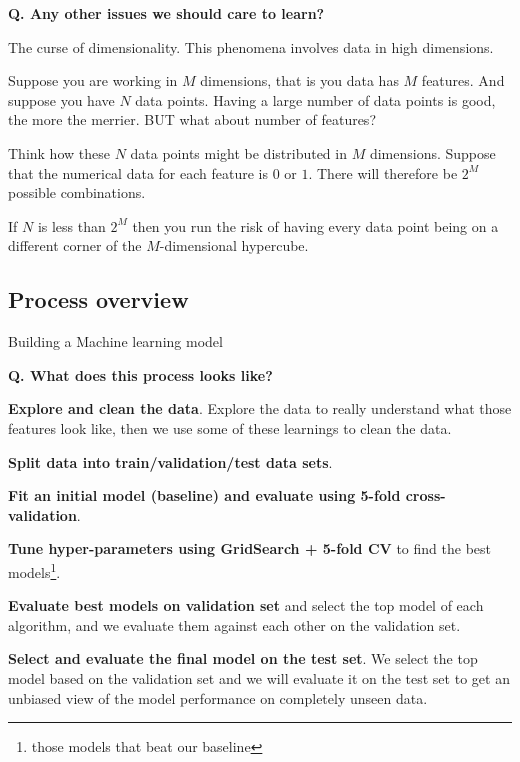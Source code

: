 \begin{frame}[fragile, label={CoD}]{\textbf{Q. Any other issues we should care to learn?}}
  \begin{wideitemize}
    \item The curse of dimensionality. This phenomena involves data in high dimensions.
    \item Suppose you are working in $M$ dimensions, that is you data has $M$
    features. And suppose you have $N$ data points. Having a large number of
    data points is good, the more the merrier. BUT what about number of features?
    \item Think how these $N$ data points might be distributed in $M$ dimensions.
    Suppose that the numerical data for each feature is $0$ or $1$. There will
    therefore be $2^{M}$ possible combinations.
    \item If $N$ is less than $2^{M}$ then you run the risk of having every data
    point being on a different corner of the $M$-dimensional hypercube.
  \end{wideitemize}
\end{frame}

\subsection{Process overview}
\begin{transitionsubframe}
  \begin{center}
    \Huge Building a Machine learning model
  \end{center}
\end{transitionsubframe}

\begin{frame}[fragile]{\textbf{Q. What does this process looks like?}}
  \begin{wideitemize}
    \item \textbf{Explore and clean the data}. Explore the data to really understand
    what those features look like, then we use some of these learnings to clean the data.
    \item \textbf{Split data into train/validation/test data sets}.
    \item \textbf{Fit an initial model (baseline) and evaluate using 5-fold cross-validation}.
    \item \textbf{Tune hyper-parameters using GridSearch + 5-fold CV} to find the best models\footnote{those models that beat our baseline}.
    \item \textbf{Evaluate best models on validation set} and select the top model of each
    algorithm, and we evaluate them against each other on the validation set.
    \item \textbf{Select and evaluate the final model on the test set}. We select
    the top model based on the validation set and we will evaluate it on the test
    set to get an unbiased view of the model performance on completely unseen data.
  \end{wideitemize}
\end{frame}

